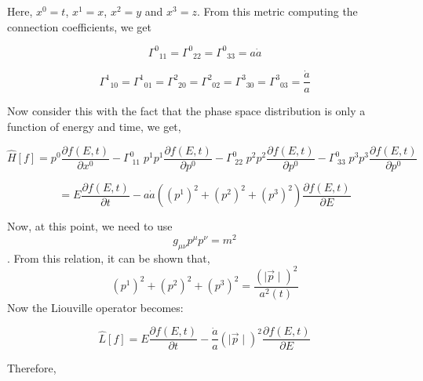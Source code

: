 \documentclass[12pt]{report}
\begin{document}
Here, $x^0=t$, $x^1=x$, $x^2=y$ and $x^3=z$. From this metric computing the connection coefficients, we get \cite{gwald}

$$\Gamma^0_{\;\;11}=\Gamma^0_{\;\;22}=\Gamma^0_{\;\;33}=a
\dot{a}$$

$$\Gamma^1_{\;\;10}=\Gamma^1_{\;\;01}=\Gamma^2_{\;\;20}=\Gamma^2_{\;\;02}=\Gamma^3_{\;\;30}=\Gamma^3_{\;\;03}=\frac{\dot{a}}{a}$$

Now consider this with the fact that the phase space distribution is only a function of energy and time, we get,


$$\hat{H}[f]=p^0 \frac{\partial f(E,t)}{\partial x^0}-\Gamma^0_{\;11} \;p^1 p^1 \frac{\partial f(E,t)}{\partial p^0}-\Gamma^0_{\;22} \;p^2 p^2 \frac{\partial f(E,t)}{\partial p^0}-\Gamma^0_{\;33} \;p^3 p^3 \frac{\partial f(E,t)}{\partial p^0}$$

$$=E \frac{\partial f(E,t)}{\partial t}- a\dot{a}\left((p^1)^2+(p^2)^2+(p^3)^2\right) \frac{\partial f(E,t)}{\partial E} $$

Now, at this point, we need to use $$g_{\mu \nu}p^\mu p^\nu= m^2$$.
From this relation, it can be shown that,
$$(p^1)^2+(p^2)^2+(p^3)^2= \frac{(\mid\vec{p}\mid)^2}{a^2(t)}$$ 
Now the Liouville operator becomes:


$$\hat{L}[f]=E\frac{\partial f(E,t)}{\partial t}- \frac{\dot{a}}{a} \left(\mid \vec{p}\mid \right)^2 \frac{\partial f(E,t)}{\partial E}$$

Therefore,
\end{document}
